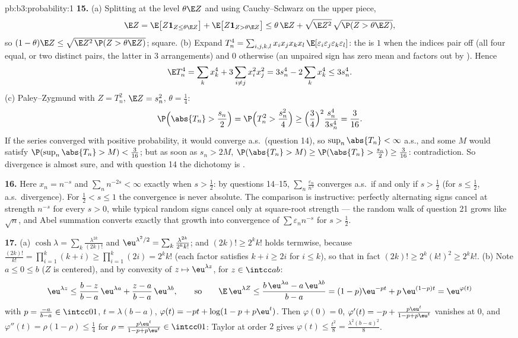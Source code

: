 \begin{solution}{pb:b3:probability:1}
\textbf{15.} (a) Splitting at the level $\theta\E Z$ and
using Cauchy--Schwarz on the upper piece,
\[
\E Z = \E\bigl[Z\mathbf 1_{Z \leq \theta\E Z}\bigr] +
\E\bigl[Z\mathbf 1_{Z > \theta\E Z}\bigr]
\leq \theta\,\E Z + \sqrt{\E Z^2}\,
\sqrt{\P(Z > \theta\E Z)} ,
\]
so $(1 - \theta)\E Z \leq \sqrt{\E Z^2\,\P(Z > \theta\E
Z)}$; square. (b) Expand $T_n^4 =
\sum_{i,j,k,l}x_ix_jx_kx_l\,
\E[\varepsilon_i\varepsilon_j\varepsilon_k\varepsilon_l]$:
the  is $1$ when the indices pair off (all four
equal, or two distinct pairs, the latter in $3$
arrangements) and $0$ otherwise (an unpaired sign has zero
mean and factors out by ). Hence
\[
\E T_n^4 = \sum_kx_k^4 + 3\sum_{i\neq j}x_i^2x_j^2 =
3s_n^4 - 2\sum_kx_k^4 \leq 3s_n^4 .
\]
(c) Paley--Zygmund with $Z = T_n^2$, $\E Z = s_n^2$,
$\theta = \frac14$:
\[
\P\Bigl(\abs{T_n} > \frac{s_n}2\Bigr) = \P\Bigl(T_n^2 >
\frac{s_n^2}4\Bigr) \geq \Bigl(\frac34\Bigr)^2
\frac{s_n^4}{3s_n^4} = \frac3{16} .
\]
If the series converged with positive probability, it
would converge a.s.\ (question 14), so $\sup_n\abs{T_n} <
\infty$ a.s., and some $M$ would satisfy
$\P(\sup_n\abs{T_n} > M) < \frac3{16}$; but as soon as $s_n
> 2M$, $\P(\abs{T_n} > M) \geq \P(\abs{T_n} > \frac{s_n}2)
\geq \frac3{16}$: contradiction. So divergence is almost
sure, and with question 14 the dichotomy is .

\textbf{16.} Here $x_n = n^{-s}$ and $\sum_nn^{-2s} <
\infty$ exactly when $s > \frac12$: by questions 14--15,
$\sum_n\frac{\varepsilon_n}{n^s}$ converges a.s.\ if and
only if $s > \frac12$ (for $s \leq \frac12$, a.s.\
divergence). For $\frac12 < s \leq 1$ the convergence is
never absolute. The comparison is instructive: perfectly
alternating signs cancel at strength $n^{-s}$ for every $s
> 0$, while typical random signs cancel only at
square-root strength --- the random walk of question 21
grows like $\sqrt n$, and Abel summation converts exactly
that growth into convergence of $\sum\varepsilon_nn^{-s}$
for $s > \frac12$.

\textbf{17.} (a) $\cosh\lambda =
\sum_k\frac{\lambda^{2k}}{(2k)!}$ and $\eu^{\lambda^2/2} =
\sum_k\frac{\lambda^{2k}}{2^kk!}$; and $(2k)! \geq 2^kk!$
holds termwise, because $\frac{(2k)!}{k!} =
\prod_{i=1}^k(k + i) \geq \prod_{i=1}^k(2i) = 2^kk!$ (each
factor satisfies $k + i \geq 2i$ for $i \leq k$), so that
in fact $(2k)! \geq 2^k(k!)^2 \geq 2^kk!$. (b) Note $a \leq 0 \leq b$ ($Z$ is
centered), and by convexity of $z \mapsto \eu^{\lambda z}$,
for $z \in \intcc ab$:
\[
\eu^{\lambda z} \leq \frac{b - z}{b - a}\,\eu^{\lambda a} +
\frac{z - a}{b - a}\,\eu^{\lambda b},
\qquad\text{so}\qquad
\E\,\eu^{\lambda Z} \leq \frac{b\,\eu^{\lambda a} -
a\,\eu^{\lambda b}}{b - a}
= (1 - p)\eu^{-pt} + p\,\eu^{(1-p)t} = \eu^{\varphi(t)}
\]
with $p = \frac{-a}{b-a} \in \intcc01$, $t = \lambda(b -
a)$, $\varphi(t) = -pt + \log(1 - p + p\eu^t)$. Then
$\varphi(0) = 0$, $\varphi'(t) = -p + \frac{p\eu^t}{1 - p +
p\eu^t}$ vanishes at $0$, and $\varphi''(t) = \rho(1 -
\rho) \leq \frac14$ for $\rho = \frac{p\eu^t}{1 - p +
p\eu^t} \in \intcc01$: Taylor at order $2$ gives
$\varphi(t) \leq \frac{t^2}8 = \frac{\lambda^2(b-a)^2}8$.


\end{solution}
